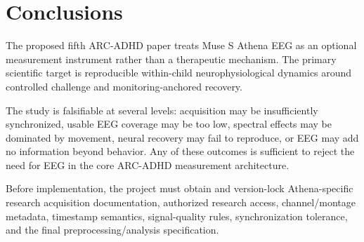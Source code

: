 \section{Conclusions}

The proposed fifth ARC-ADHD paper treats Muse S Athena EEG as an optional measurement instrument rather than a therapeutic mechanism. The primary scientific target is reproducible within-child neurophysiological dynamics around controlled challenge and monitoring-anchored recovery.

The study is falsifiable at several levels: acquisition may be insufficiently synchronized, usable EEG coverage may be too low, spectral effects may be dominated by movement, neural recovery may fail to reproduce, or EEG may add no information beyond behavior. Any of these outcomes is sufficient to reject the need for EEG in the core ARC-ADHD measurement architecture.

Before implementation, the project must obtain and version-lock Athena-specific research acquisition documentation, authorized research access, channel/montage metadata, timestamp semantics, signal-quality rules, synchronization tolerance, and the final preprocessing/analysis specification.
